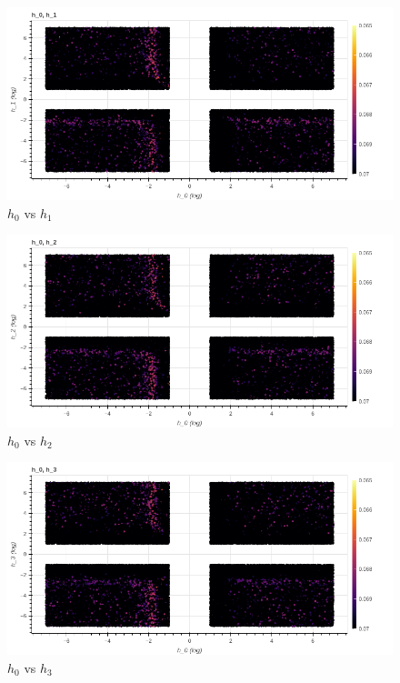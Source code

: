 \documentclass[openany]{article}
\begin{document}
\begin{figure}[!h]
    \centering
    \includegraphics[width=\textwidth]{h1.png}
    \caption{\( h_0\) vs \(h_1\)}
    \label{fig:my_label}
\end{figure}

\newpage 

\begin{figure}[!h]
    \centering
    \includegraphics[width=\textwidth]{h2.png}
    \caption{\( h_0\) vs \(h_2\)}
    \label{fig:my_label}
\end{figure}



\begin{figure}[!h]
    \centering
    \includegraphics[width=\textwidth]{h3.png}
    \caption{\( h_0\) vs \(h_3\)}
    \label{fig:my_label}
\end{figure}
\end{document}
